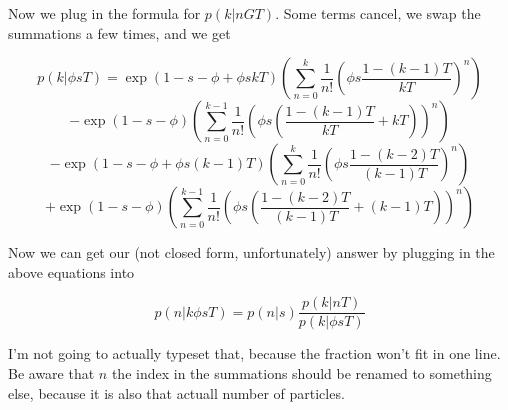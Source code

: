 \documentclass{../note}
\begin{document}
\begin{solution}
Now we plug in the formula for $p(k|nGT)$. Some terms cancel, we swap the summations a few times, and we get

\begin{equation*}
p(k | \phi s T) 
= \exp(1 - s - \phi + \phi s kT) 
\left( \sum_{n=0}^{k} \frac{1}{n!} 
\left( \phi s \frac{1 - (k-1)T}{kT} \right)^n \right)
\end{equation*}
\begin{equation*}
- \exp(1 - s - \phi) 
\left( \sum_{n=0}^{k-1} \frac{1}{n!} 
\left( \phi s \left( \frac{1-(k-1)T}{kT} + kT \right) \right)^n \right)
\end{equation*}
\begin{equation*}
- \exp(1 - s - \phi + \phi s (k-1)T) 
\left( \sum_{n=0}^{k} \frac{1}{n!} 
\left( \phi s \frac{1 - (k-2)T}{(k-1)T} \right)^n \right)
\end{equation*}
\begin{equation*}
+ \exp(1 - s - \phi) 
\left( \sum_{n=0}^{k-1} \frac{1}{n!} 
\left( \phi s \left( \frac{1-(k-2)T}{(k-1)T} + (k-1)T \right) \right)^n \right)
\end{equation*}

Now we can get our (not closed form, unfortunately) answer by plugging in the above equations into

\begin{equation*}
p(n | k \phi s T) 
= p(n | s) \frac{p(k | n T)}{p(k | \phi s T)}
\end{equation*}

I'm not going to actually typeset that, because the fraction won't fit in one line. Be aware that $n$ the index in the summations should be renamed to something else, because it is also that actuall number of particles.

\end{solution}
\end{document}
